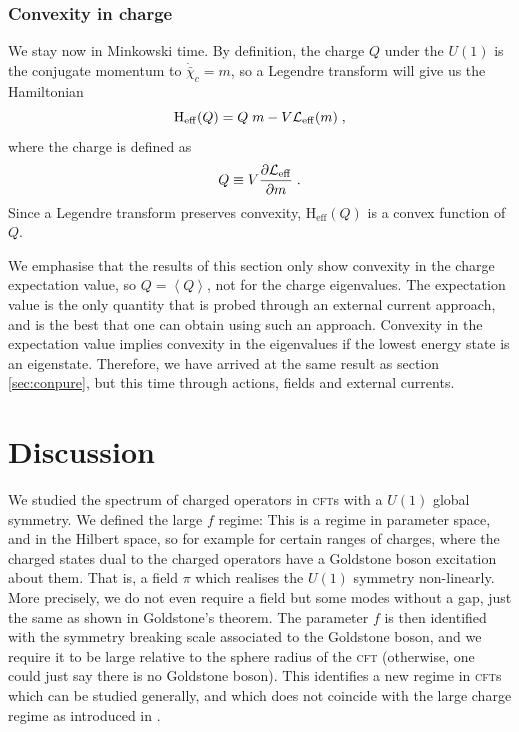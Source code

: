 \documentclass[11pt]{article}
\numberwithin{equation}{section}
\newcommand{\be}{\begin{equation}} \newcommand{\ee}{\end{equation}}
\begin{document}
\subsubsection*{Convexity in charge}

   We stay now in Minkowski time. By definition, the charge \(Q\) under the \(U(1)\) is the conjugate momentum to $\dot{\bar{\chi}}_c=m$, so a Legendre transform will give us the Hamiltonian
	\be
	{\mathrm H}_{\mathrm{eff}}(Q) = Q\; m - V {\cal L}_{\mathrm{eff}}(m) \;,
	\label{legtoH}
	\ee
	where the charge is defined as
	\be
	 Q \equiv V \frac{\partial{\cal L}_{\mathrm{eff}}}{\partial m} \;.
	 \label{qdeflm}
	\ee
	Since a Legendre transform preserves convexity, ${\mathrm H}_{\mathrm{eff}}(Q)$ is a convex function of $Q$.
  
 We emphasise that the results of this section only show convexity in the charge expectation value, so $Q = \left< Q \right>$, not for the charge eigenvalues. The expectation value is the only quantity that is probed through an external current approach, and is the best that one can obtain using such an approach. Convexity in the expectation value implies convexity in the eigenvalues if the lowest energy state is an eigenstate. Therefore, we have arrived at the same result as section \ref{sec:conpure}, but this time through actions, fields and external currents. 
  
   


\section{Discussion}
\label{sec:dis}

We studied the spectrum of charged operators in \textsc{cft}s with a $U(1)$ global symmetry. We defined the large $f$ regime: This is a regime in parameter space, and in the Hilbert space, so for example for certain ranges of charges, where the charged states dual to the charged operators have a Goldstone boson excitation about them. That is, a field $\pi$ which realises the $U(1)$ symmetry non-linearly. More precisely, we do not even require a field but some modes without a gap, just the same as shown in Goldstone's theorem. The parameter $f$ is then identified with the symmetry breaking scale associated to the Goldstone boson, and we require it to be large relative to the sphere radius of the \textsc{cft} (otherwise, one could just say there is no Goldstone boson). This identifies a new regime in \textsc{cft}s which can be studied generally, and which does not coincide with the large charge regime as introduced in \cite{Hellerman:2015nra}.  
\end{document}
